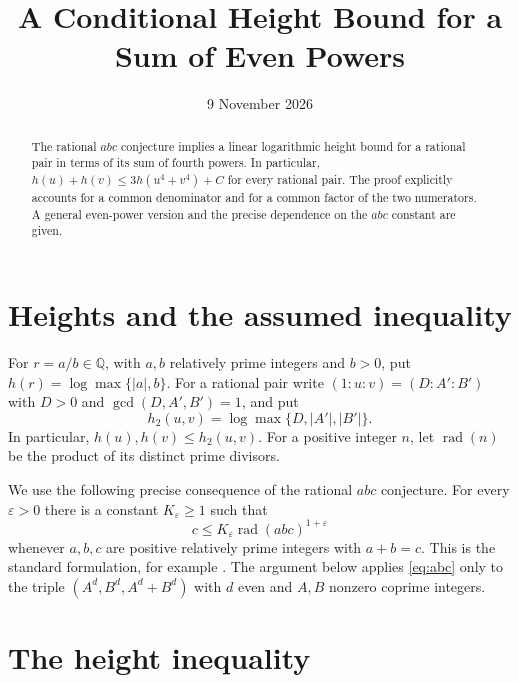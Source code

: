 \documentclass[11pt,a4paper]{article}
\title{A Conditional Height Bound for a Sum of Even Powers}
\author{}\date{9 November 2026}
\newcommand{\Q}{\mathbb Q}
\DeclareMathOperator{\rad}{rad}
\begin{document}
\maketitle
\begin{abstract}
The rational $abc$ conjecture implies a linear logarithmic height
bound for a rational pair in terms of its sum of fourth powers.
In particular, $h(u)+h(v)\le3h(u^4+v^4)+C$ for every rational
pair. The proof explicitly accounts for a common denominator and
for a common factor of the two numerators. A general even-power
version and the precise dependence on the $abc$ constant are given.
\end{abstract}

\section{Heights and the assumed inequality}

For $r=a/b\in\Q$, with $a,b$ relatively prime integers and $b>0$,
put $h(r)=\log\max\{|a|,b\}$. For a rational pair write
$(1:u:v)=(D:A':B')$ with $D>0$ and
$\gcd(D,A',B')=1$, and put
\[
             h_2(u,v)=\log\max\{D,|A'|,|B'|\}.
\]
In particular, $h(u),h(v)\le h_2(u,v)$. For a positive integer
$n$, let $\rad(n)$ be the product of its distinct prime divisors.

We use the following precise consequence of the rational $abc$
conjecture. For every $\varepsilon>0$ there is a constant
$K_\varepsilon\ge1$ such that
\begin{equation}\label{eq:abc}
 c\le K_\varepsilon\rad(abc)^{1+\varepsilon}
\end{equation}
whenever $a,b,c$ are positive relatively prime integers with
$a+b=c$. This is the standard formulation, for example
\cite[Section~1]{Granville}. The argument below applies
\eqref{eq:abc} only to the triple $(A^d,B^d,A^d+B^d)$ with
$d$ even and $A,B$ nonzero coprime integers.

\section{The height inequality}
\end{document}
